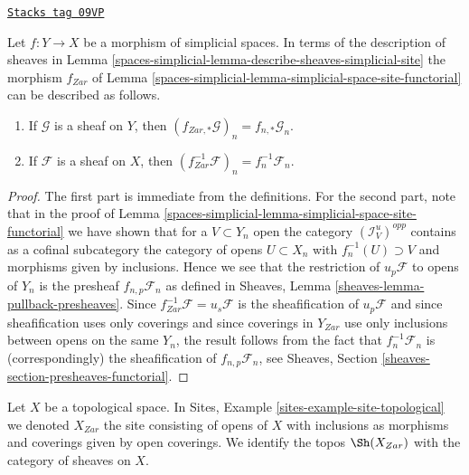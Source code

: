 \begin{lemma}
\label{spaces-simplicial-lemma-describe-functoriality}
\href{https://stacks.math.columbia.edu/tag/09VP}{\texttt{Stacks tag 09VP}}

Let $f : Y \to X$ be a morphism of simplicial spaces. In terms of the
description of sheaves in
Lemma \ref{spaces-simplicial-lemma-describe-sheaves-simplicial-site} the
morphism $f_{Zar}$ of Lemma \ref{spaces-simplicial-lemma-simplicial-space-site-functorial}
can be described as follows.
\begin{enumerate}
\item If $\mathcal{G}$ is a sheaf on $Y$, then
$(f_{Zar, *}\mathcal{G})_n = f_{n, *}\mathcal{G}_n$.
\item If $\mathcal{F}$ is a sheaf on $X$, then
$(f_{Zar}^{-1}\mathcal{F})_n = f_n^{-1}\mathcal{F}_n$.
\end{enumerate}
\end{lemma}

\begin{proof}
The first part is immediate from the definitions. For the second part, note
that in the proof of
Lemma \ref{spaces-simplicial-lemma-simplicial-space-site-functorial}
we have shown that for a $V \subset Y_n$ open the category
$(\mathcal{I}_V^u)^{opp}$ contains as a cofinal subcategory
the category of opens $U \subset X_n$ with $f_n^{-1}(U) \supset V$
and morphisms given by inclusions. Hence we see that the restriction
of $u_p\mathcal{F}$ to opens of $Y_n$ is the presheaf
$f_{n, p}\mathcal{F}_n$ as defined in
Sheaves, Lemma \ref{sheaves-lemma-pullback-presheaves}.
Since $f_{Zar}^{-1}\mathcal{F} = u_s\mathcal{F}$ is the sheafification
of $u_p\mathcal{F}$ and since sheafification uses only coverings and
since coverings in $Y_{Zar}$ use only inclusions between opens on the
same $Y_n$, the result follows from the fact that $f_n^{-1}\mathcal{F}_n$
is (correspondingly) the sheafification of $f_{n, p}\mathcal{F}_n$, see
Sheaves, Section \ref{sheaves-section-presheaves-functorial}.
\end{proof}

Let $X$ be a topological space. In
Sites, Example \ref{sites-example-site-topological}
we denoted $X_{Zar}$ the site consisting of opens of $X$
with inclusions as morphisms and coverings given by open coverings.
We identify the topos $\Sh(X_{Zar})$ with the category
of sheaves on $X$.

